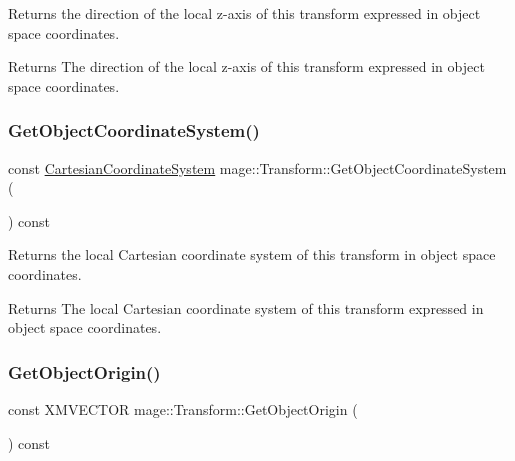 Returns the direction of the local z-\/axis of this transform expressed in object space coordinates.

\begin{DoxyReturn}{Returns}
The direction of the local z-\/axis of this transform expressed in object space coordinates. 
\end{DoxyReturn}
\hypertarget{classmage_1_1_transform_a051432f12292cd6c46ec2483eca87d86}{}\label{classmage_1_1_transform_a051432f12292cd6c46ec2483eca87d86} 
\subsubsection{\texorpdfstring{Get\+Object\+Coordinate\+System()}{GetObjectCoordinateSystem()}}
{\footnotesize\ttfamily const \hyperlink{structmage_1_1_cartesian_coordinate_system}{Cartesian\+Coordinate\+System} mage\+::\+Transform\+::\+Get\+Object\+Coordinate\+System (\begin{DoxyParamCaption}{ }\end{DoxyParamCaption}) const\hspace{0.3cm}{\ttfamily [noexcept]}}

Returns the local Cartesian coordinate system of this transform in object space coordinates.

\begin{DoxyReturn}{Returns}
The local Cartesian coordinate system of this transform expressed in object space coordinates. 
\end{DoxyReturn}
\hypertarget{classmage_1_1_transform_a138b6649becd0f12b36a7db44e46ce31}{}\label{classmage_1_1_transform_a138b6649becd0f12b36a7db44e46ce31} 
\subsubsection{\texorpdfstring{Get\+Object\+Origin()}{GetObjectOrigin()}}
{\footnotesize\ttfamily const X\+M\+V\+E\+C\+T\+OR mage\+::\+Transform\+::\+Get\+Object\+Origin (\begin{DoxyParamCaption}{ }\end{DoxyParamCaption}) const\hspace{0.3cm}{\ttfamily [noexcept]}}

